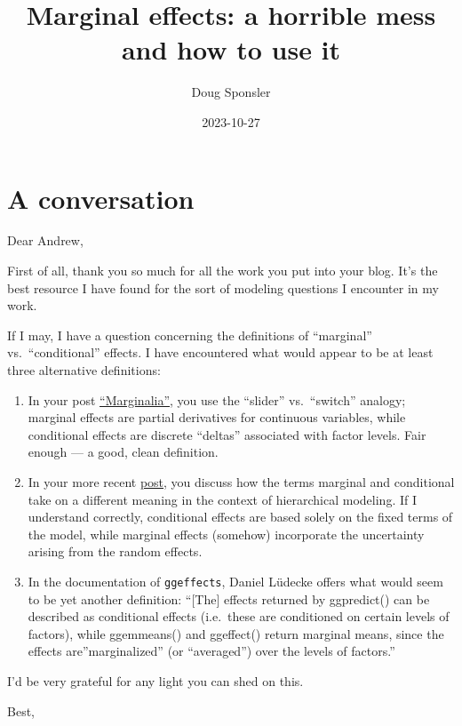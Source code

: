 \documentclass[
]{article}
\title{Marginal effects: a horrible mess and how to use it}
\author{Doug Sponsler}
\date{2023-10-27}
\begin{document}
\maketitle

\hypertarget{a-conversation}{%
\section{A conversation}\label{a-conversation}}

Dear Andrew,

First of all, thank you so much for all the work you put into your blog.
It's the best resource I have found for the sort of modeling questions I
encounter in my work.

If I may, I have a question concerning the definitions of ``marginal''
vs.~``conditional'' effects. I have encountered what would appear to be
at least three alternative definitions:

\begin{enumerate}
\def\labelenumi{\arabic{enumi}.}
\item
  In your post
  \href{https://www.andrewheiss.com/blog/2022/05/20/marginalia/}{``Marginalia''},
  you use the ``slider'' vs.~``switch'' analogy; marginal effects are
  partial derivatives for continuous variables, while conditional
  effects are discrete ``deltas'' associated with factor levels. Fair
  enough --- a good, clean definition.
\item
  In your more recent
  \href{https://www.andrewheiss.com/blog/2022/11/29/conditional-marginal-marginaleffects/}{post},
  you discuss how the terms marginal and conditional take on a different
  meaning in the context of hierarchical modeling. If I understand
  correctly, conditional effects are based solely on the fixed terms of
  the model, while marginal effects (somehow) incorporate the
  uncertainty arising from the random effects.
\item
  In the documentation of \texttt{ggeffects}, Daniel Lüdecke offers what
  would seem to be yet another definition: ``{[}The{]} effects returned
  by ggpredict() can be described as conditional effects (i.e.~these are
  conditioned on certain levels of factors), while ggemmeans() and
  ggeffect() return marginal means, since the effects
  are''marginalized'' (or ``averaged'') over the levels of factors.''
\end{enumerate}

I'd be very grateful for any light you can shed on this.

Best,
\end{document}
